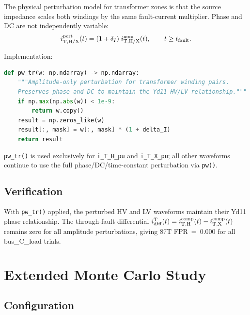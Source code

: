 \documentclass[12pt,a4paper]{article}
\begin{document}
The physical perturbation model for transformer zones is that the
source impedance scales both windings by the same fault-current
multiplier.  Phase and DC are not independently variable:
\begin{equation}
  i_{\rm T,H/X}^{\rm pert}(t) = (1+\delta_I)\; i_{\rm T,H/X}^{\rm nom}(t),
  \qquad t \geq t_{\rm fault}.
  \label{eq:ptr}
\end{equation}

Implementation:

\begin{lstlisting}[language=Python,
    caption={Amplitude-only transformer perturbation in
             \texttt{run\_monte\_carlo.py}},
    label=lst:pwtr]
def pw_tr(w: np.ndarray) -> np.ndarray:
    """Amplitude-only perturbation for transformer winding pairs.
    Preserves phase and DC to maintain the Yd11 HV/LV relationship."""
    if np.max(np.abs(w)) < 1e-9:
        return w.copy()
    result = np.zeros_like(w)
    result[:, mask] = w[:, mask] * (1 + delta_I)
    return result
\end{lstlisting}

\texttt{pw\_tr()} is used exclusively for \texttt{i\_T\_H\_pu} and
\texttt{i\_T\_X\_pu}; all other waveforms continue to use the full
phase/DC/time-constant perturbation via \texttt{pw()}.

\subsection{Verification}

With \texttt{pw\_tr()} applied, the perturbed HV and LV waveforms
maintain their Yd11 phase relationship.  The through-fault differential
$i_{\rm diff}^{\rm T}(t) = i_{\rm T,H}^{\rm comp}(t) - i_{\rm T,X}^{\rm comp}(t)$
remains zero for all amplitude perturbations, giving 87T FPR~=~0.000
for all bus\_C\_load trials.

\section{Extended Monte Carlo Study}
\label{sec:mc}

\subsection{Configuration}
\end{document}

